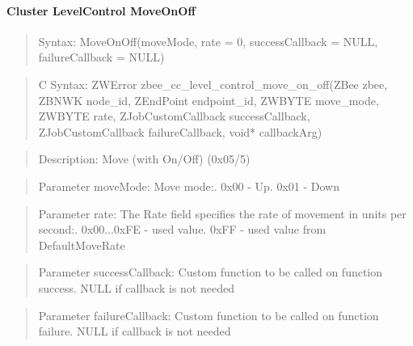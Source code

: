 \paragraph{Cluster LevelControl MoveOnOff}
\begin{quote}Syntax: MoveOnOff(moveMode, rate = 0, successCallback = NULL, failureCallback = NULL)\end{quote}
\begin{quote}C Syntax: ZWError zbee\_cc\_level\_control\_move\_on\_off(ZBee zbee, ZBNWK node\_id, ZEndPoint endpoint\_id, ZWBYTE move\_mode, ZWBYTE rate, ZJobCustomCallback successCallback, ZJobCustomCallback failureCallback, void* callbackArg)\end{quote}
\begin{quote}Description: Move (with On/Off) (0x05/5)\end{quote}
\begin{quote}Parameter moveMode: Move mode:. 0x00 - Up. 0x01 - Down\end{quote}
\begin{quote}Parameter rate: The Rate field specifies the rate of movement in units per second:. 0x00...0xFE - used value. 0xFF        - used value from DefaultMoveRate\end{quote}
\begin{quote}Parameter successCallback: Custom function to be called on function success. NULL if callback is not needed\end{quote}
\begin{quote}Parameter failureCallback: Custom function to be called on function failure. NULL if callback is not needed\end{quote}


